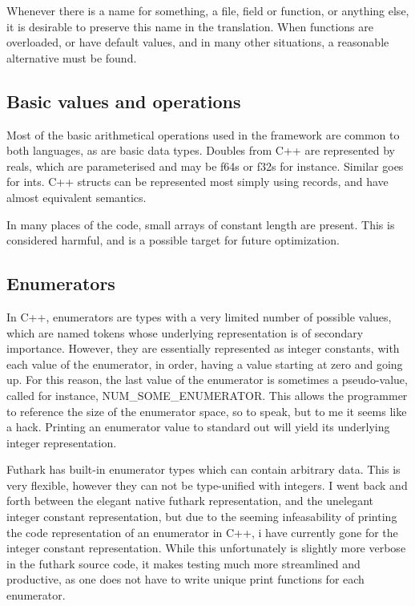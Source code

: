 Whenever there is a name for something, a file, field or function, or anything else, it is desirable to preserve this name in the translation. When functions are overloaded, or have default values, and in many other situations, a reasonable alternative must be found.

\subsection{Basic values and operations}
Most of the basic arithmetical operations used in the framework are common to both languages, as are basic data types. Doubles from C++ are represented by reals, which are parameterised and may be f64s or f32s for instance. Similar goes for ints. C++ structs can be represented most simply using records, and have almost equivalent semantics.

In many places of the code, small arrays of constant length are present. This is considered harmful\cite{smallarraysbad}, and is a possible target for future optimization.

\subsection{Enumerators}
In C++, enumerators are types with a very limited number of possible values, which are named tokens whose underlying representation is of secondary importance. However, they are essentially represented as integer constants, with each value of the enumerator, in order, having a value starting at zero and going up. For this reason, the last value of the enumerator is sometimes a pseudo-value, called for instance, NUM_SOME_ENUMERATOR. This allows the programmer to reference the size of the enumerator space, so to speak, but to me it seems like a hack. Printing an enumerator value to standard out will yield its underlying integer representation.

Futhark has built-in enumerator types which can contain arbitrary data. This is very flexible, however they can not be type-unified with integers. I went back and forth between the elegant native futhark representation, and the unelegant integer constant representation, but due to the seeming infeasability of printing the code representation of an enumerator in C++, i have currently gone for the integer constant representation. While this unfortunately is slightly more verbose in the futhark source code, it makes testing much more streamlined and productive, as one does not have to write unique print functions for each enumerator.

